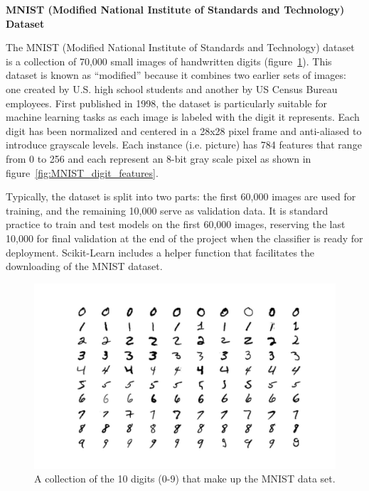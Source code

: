 \documentclass[12pt,letter]{article}
\begin{document}
\begin{data}
\textbf{MNIST (Modified National Institute of Standards and Technology) Dataset}

\noindent  The MNIST (Modified National Institute of Standards and Technology) dataset is a collection of 70,000 small images of handwritten digits (figure~\ref{fig:MNIST_data_set}). This dataset is known as ``modified'' because it combines two earlier sets of images: one created by U.S. high school students and another by US Census Bureau employees. First published in 1998, the dataset is particularly suitable for machine learning tasks as each image is labeled with the digit it represents. Each digit has been normalized and centered in a 28x28 pixel frame and anti-aliased to introduce grayscale levels. Each instance (i.e. picture) has 784 features that range from 0 to 256 and each represent an 8-bit gray scale pixel as shown in figure~\ref{fig:MNIST_digit_features}.

Typically, the dataset is split into two parts: the first 60,000 images are used for training, and the remaining 10,000 serve as validation data. It is standard practice to train and test models on the first 60,000 images, reserving the last 10,000 for final validation at the end of the project when the classifier is ready for deployment. Scikit-Learn includes a helper function that facilitates the downloading of the MNIST dataset.

\begin{figure}[H]
    \centering
    \includegraphics[width=6.0in]{../figures/MNIST_data_set}
    \caption{A collection of the 10 digits (0-9) that make up the MNIST data set.}
    \label{fig:MNIST_data_set}
\end{figure}





\end{data}
\end{document}
